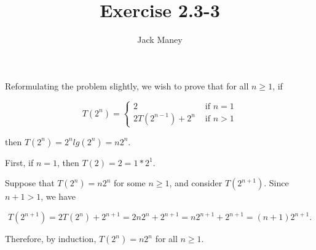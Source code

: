 \documentclass{article}
\begin{document}
\title{Exercise 2.3-3}
\author{Jack Maney}
\maketitle

Reformulating the problem slightly, we wish to prove that for all $n\geq 1$, if

\[
	T(2^n) = \left\{
		\begin{array}{lr}
			2 & \textrm{ if } n = 1 \\
			2 T(2^{n-1}) + 2^n & \textrm{ if } n > 1
		\end{array}
	\right.
\]

\noindent then $T(2^n) = 2^n lg(2^n) = n 2^n$.

First, if $n=1$, then $T(2) = 2 = 1 * 2^1$.

Suppose that $T(2^n) = n 2^n$ for some $n\geq 1$, and consider $T(2^{n+1})$. Since $n+1 > 1$, we have

\[
	T(2^{n+1}) = 2 T(2^n) + 2^{n+1} = 2n2^n + 2^{n+1} = n 2^{n+1} + 2^{n+1} = (n+1)2^{n+1}.
\]

Therefore, by induction, $T(2^n) = n2^n$ for all $n\geq 1$.
\end{document}

